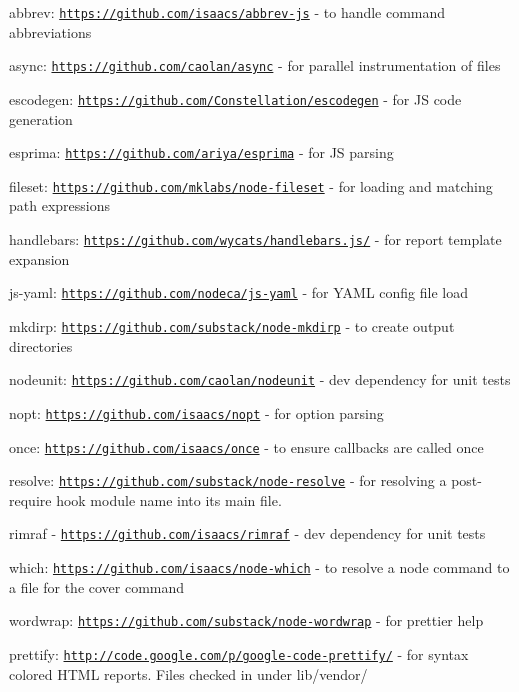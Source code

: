 \begin{DoxyItemize}
\item abbrev\+: \href{https://github.com/isaacs/abbrev-js}{\tt https\+://github.\+com/isaacs/abbrev-\/js} -\/ to handle command abbreviations
\item async\+: \href{https://github.com/caolan/async}{\tt https\+://github.\+com/caolan/async} -\/ for parallel instrumentation of files
\item escodegen\+: \href{https://github.com/Constellation/escodegen}{\tt https\+://github.\+com/\+Constellation/escodegen} -\/ for J\+S code generation
\item esprima\+: \href{https://github.com/ariya/esprima}{\tt https\+://github.\+com/ariya/esprima} -\/ for J\+S parsing
\item fileset\+: \href{https://github.com/mklabs/node-fileset}{\tt https\+://github.\+com/mklabs/node-\/fileset} -\/ for loading and matching path expressions
\item handlebars\+: \href{https://github.com/wycats/handlebars.js/}{\tt https\+://github.\+com/wycats/handlebars.\+js/} -\/ for report template expansion
\item js-\/yaml\+: \href{https://github.com/nodeca/js-yaml}{\tt https\+://github.\+com/nodeca/js-\/yaml} -\/ for Y\+A\+M\+L config file load
\item mkdirp\+: \href{https://github.com/substack/node-mkdirp}{\tt https\+://github.\+com/substack/node-\/mkdirp} -\/ to create output directories
\item nodeunit\+: \href{https://github.com/caolan/nodeunit}{\tt https\+://github.\+com/caolan/nodeunit} -\/ dev dependency for unit tests
\item nopt\+: \href{https://github.com/isaacs/nopt}{\tt https\+://github.\+com/isaacs/nopt} -\/ for option parsing
\item once\+: \href{https://github.com/isaacs/once}{\tt https\+://github.\+com/isaacs/once} -\/ to ensure callbacks are called once
\item resolve\+: \href{https://github.com/substack/node-resolve}{\tt https\+://github.\+com/substack/node-\/resolve} -\/ for resolving a post-\/require hook module name into its main file.
\item rimraf -\/ \href{https://github.com/isaacs/rimraf}{\tt https\+://github.\+com/isaacs/rimraf} -\/ dev dependency for unit tests
\item which\+: \href{https://github.com/isaacs/node-which}{\tt https\+://github.\+com/isaacs/node-\/which} -\/ to resolve a node command to a file for the {\ttfamily cover} command
\item wordwrap\+: \href{https://github.com/substack/node-wordwrap}{\tt https\+://github.\+com/substack/node-\/wordwrap} -\/ for prettier help
\item prettify\+: \href{http://code.google.com/p/google-code-prettify/}{\tt http\+://code.\+google.\+com/p/google-\/code-\/prettify/} -\/ for syntax colored H\+T\+M\+L reports. Files checked in under {\ttfamily lib/vendor/}
\end{DoxyItemize}

